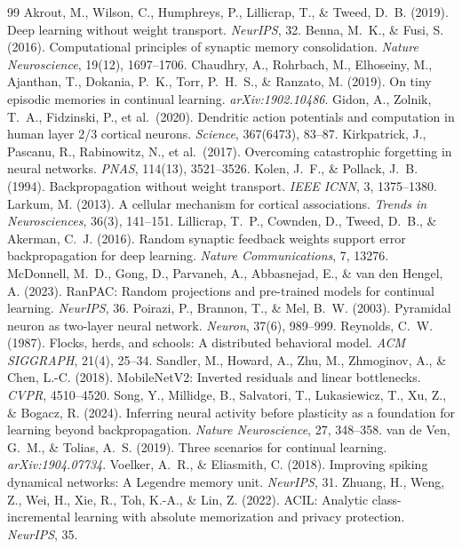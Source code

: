 \documentclass[11pt,a4paper]{article}
\begin{document}
\begin{thebibliography}{99}
\small
{} Akrout, M., Wilson, C., Humphreys, P., Lillicrap, T., \& Tweed, D.~B. (2019). Deep learning without weight transport. \textit{NeurIPS}, 32.
 Benna, M.~K., \& Fusi, S. (2016). Computational principles of synaptic memory consolidation. \textit{Nature Neuroscience}, 19(12), 1697--1706.
 Chaudhry, A., Rohrbach, M., Elhoseiny, M., Ajanthan, T., Dokania, P.~K., Torr, P.~H.~S., \& Ranzato, M. (2019). On tiny episodic memories in continual learning. \textit{arXiv:1902.10486}.
 Gidon, A., Zolnik, T.~A., Fidzinski, P., et al.\ (2020). Dendritic action potentials and computation in human layer 2/3 cortical neurons. \textit{Science}, 367(6473), 83--87.
 Kirkpatrick, J., Pascanu, R., Rabinowitz, N., et al.\ (2017). Overcoming catastrophic forgetting in neural networks. \textit{PNAS}, 114(13), 3521--3526.
 Kolen, J.~F., \& Pollack, J.~B. (1994). Backpropagation without weight transport. \textit{IEEE ICNN}, 3, 1375--1380.
 Larkum, M. (2013). A cellular mechanism for cortical associations. \textit{Trends in Neurosciences}, 36(3), 141--151.
 Lillicrap, T.~P., Cownden, D., Tweed, D.~B., \& Akerman, C.~J. (2016). Random synaptic feedback weights support error backpropagation for deep learning. \textit{Nature Communications}, 7, 13276.
 McDonnell, M.~D., Gong, D., Parvaneh, A., Abbasnejad, E., \& van den Hengel, A. (2023). RanPAC: Random projections and pre-trained models for continual learning. \textit{NeurIPS}, 36.
 Poirazi, P., Brannon, T., \& Mel, B.~W. (2003). Pyramidal neuron as two-layer neural network. \textit{Neuron}, 37(6), 989--999.
 Reynolds, C.~W. (1987). Flocks, herds, and schools: A distributed behavioral model. \textit{ACM SIGGRAPH}, 21(4), 25--34.
 Sandler, M., Howard, A., Zhu, M., Zhmoginov, A., \& Chen, L.-C. (2018). MobileNetV2: Inverted residuals and linear bottlenecks. \textit{CVPR}, 4510--4520.
 Song, Y., Millidge, B., Salvatori, T., Lukasiewicz, T., Xu, Z., \& Bogacz, R. (2024). Inferring neural activity before plasticity as a foundation for learning beyond backpropagation. \textit{Nature Neuroscience}, 27, 348--358.
 van de Ven, G.~M., \& Tolias, A.~S. (2019). Three scenarios for continual learning. \textit{arXiv:1904.07734}.
 Voelker, A.~R., \& Eliasmith, C. (2018). Improving spiking dynamical networks: A Legendre memory unit. \textit{NeurIPS}, 31.
 Zhuang, H., Weng, Z., Wei, H., Xie, R., Toh, K.-A., \& Lin, Z. (2022). ACIL: Analytic class-incremental learning with absolute memorization and privacy protection. \textit{NeurIPS}, 35.
\end{thebibliography}
\end{document}
